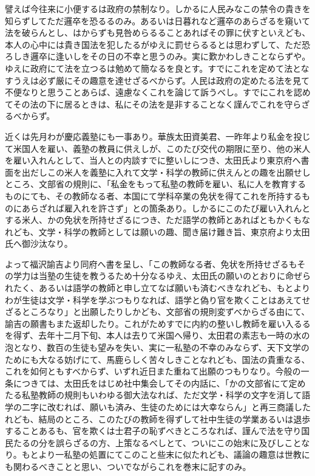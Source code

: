 \documentclass[a4paper, platex, dvipdfmx]{jsarticle}
\begin{document}
譬えば今往来に小便するは政府の禁制なり。しかるに人民みなこの禁令の貴きを知らずしてただ邏卒を恐るるのみ。あるいは日暮れなど邏卒のあらざるを窺いて法を破らんとし、はからずも見咎めらるることあればその罪に伏すといえども、本人の心中には貴き国法を犯したるがゆえに罰せらるるとは思わずして、ただ恐ろしき邏卒に逢いしをその日の不幸と思うのみ。実に歎かわしきことならずや。ゆえに政府にて法を立つるは勉めて簡なるを良とす。すでにこれを定めて法となすうえは必ず厳にその趣意を達せざるべからず。人民は政府の定めたる法を見て不便なりと思うことあらば、遠慮なくこれを論じて訴うべし。すでにこれを認めてその法の下に居るときは、私にその法を是非することなく謹んでこれを守らざるべからず。

近くは先月わが慶応義塾にも一事あり。華族太田資美君、一昨年より私金を投じて米国人を雇い、義塾の教員に供えしが、このたび交代の期限に至り、他の米人を雇い入れんとして、当人との内談すでに整いしにつき、太田氏より東京府へ書面を出だしこの米人を義塾に入れて文学・科学の教師に供えんとの趣を出願せしところ、文部省の規則に、「私金をもって私塾の教師を雇い、私に人を教育するものにても、その教師なる者、本国にて学科卒業の免状を得てこれを所持するものにあらざれば雇入れを許さず」との箇条あり。しかるにこのたび雇い入れんとする米人、かの免状を所持せざるにつき、ただ語学の教師とあればともかくもなれども、文学・科学の教師としては願いの趣、聞き届け難き旨、東京府より太田氏へ御沙汰なり。

よって福沢諭吉より同府へ書を呈し、「この教師なる者、免状を所持せざるもその学力は当塾の生徒を教うるため十分なるゆえ、太田氏の願いのとおりに命ぜられたく、あるいは語学の教師と申し立てなば願いも済むべきなれども、もとよりわが生徒は文学・科学を学ぶつもりなれば、語学と偽り官を欺くことはあえてせざるところなり」と出願したりしかども、文部省の規則変ずべからざる由にて、諭吉の願書もまた返却したり。これがためすでに内約の整いし教師を雇い入るるを得ず、去年十二月下旬、本人は去りて米国へ帰り、太田君の素志も一時の水の泡となり、数百の生徒も望みを失い、実に一私塾の不幸のみならず、天下文学のためにも大なる妨げにて、馬鹿らしく苦々しきことなれども、国法の貴重なる、これを如何ともすべからず、いずれ近日また重ねて出願のつもりなり。今般の一条につきては、太田氏をはじめ社中集会してその内話に、「かの文部省にて定めたる私塾教師の規則もいわゆる御大法なれば、ただ文学・科学の文字を消して語学の二字に改むれば、願いも済み、生徒のためには大幸ならん」と再三商議したれども、結局のところ、このたびの教師を得ずして社中生徒の学業あるいは退歩することあるも、官を欺くは士君子の恥ずべきところなれば、謹んで法を守り国民たるの分を誤らざるの方、上策なるべしとて、ついにこの始末に及びしことなり。もとより一私塾の処置にてこのこと些末に似たれども、議論の趣意は世教にも関わるべきことと思い、ついでながらこれを巻末に記すのみ。
\end{document}
